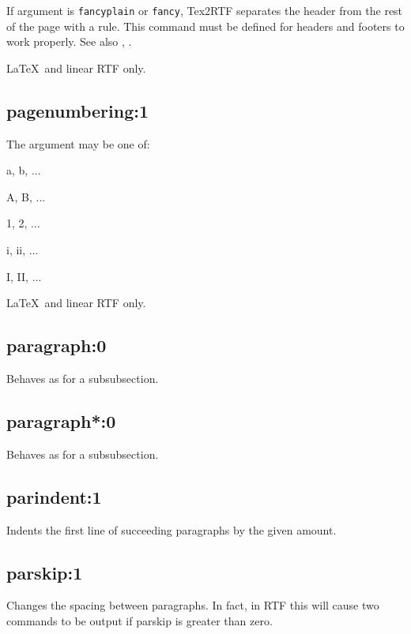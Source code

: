 If argument is {\tt fancyplain} or {\tt fancy}, Tex2RTF
separates the header from the rest of the page with a rule.
This command must be defined for headers and footers to
work properly. See also ,
.

\LaTeX\ and linear RTF only.

\subsection*{pagenumbering:1}\label{pagenumbering}

The argument may be one of:

\begin{description}
\itemsep=0pt
\item[alph] a, b, ...
\item[Alph] A, B, ...
\item[arabic] 1, 2, ...
\item[roman] i, ii, ...
\item[Roman] I, II, ...
\end{description}

\LaTeX\ and linear RTF only.

\subsection*{paragraph:0}\label{paragraph}

Behaves as for a subsubsection.

\subsection*{paragraph*:0}\label{paragraphX}

Behaves as for a subsubsection.

\subsection*{parindent:1}\label{parindent}

Indents the first line of succeeding paragraphs by the given amount.

\subsection*{parskip:1}\label{parskip}

Changes the spacing between paragraphs. In fact, in RTF this will cause
two  commands to be output if parskip is greater
than zero.

